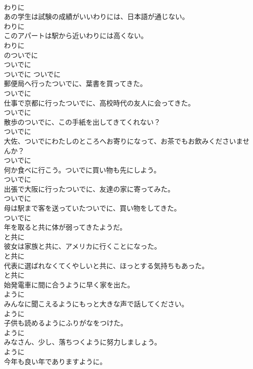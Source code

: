 \documentclass[8pt]{extreport}
\begin{document}
\begin{CJK}{UTF8}{min}
\\	わりに
\\	あの学生は試験の成績がいいわりには、日本語が通じない。	
\\	わりに
\\	このアパートは駅から近いわりには高くない。	
\\	わりに
\\	のついでに	
\\	ついでに	
\\	ついでに	ついでに
\\	郵便局へ行ったついでに、葉書を買ってきた。	
\\	ついでに
\\	仕事で京都に行ったついでに、高校時代の友人に会ってきた。	
\\	ついでに
\\	散歩のついでに、この手紙を出してきてくれない？	
\\	ついでに
\\	大佐、ついでにわたしのところへお寄りになって、お茶でもお飲みくださいませんか？	
\\	ついでに
\\	何か食べに行こう。ついでに買い物も先にしよう。	
\\	ついでに
\\	出張で大阪に行ったついでに、友達の家に寄ってみた。	
\\	ついでに
\\	母は駅まで客を送っていたついでに、買い物をしてきた。	
\\	ついでに
\\	年を取ると共に体が弱ってきたようだ。	
\\	と共に
\\	彼女は家族と共に、アメリカに行くことになった。	
\\	と共に
\\	代表に選ばれなくてくやしいと共に、ほっとする気持ちもあった。	
\\	と共に
\\	始発電車に間に合うように早く家を出た。	
\\	ように
\\	みんなに聞こえるようにもっと大きな声で話してください。	
\\	ように
\\	子供も読めるようにふりがなをつけた。	
\\	ように
\\	みなさん、少し、落ちつくように努力しましょう。	
\\	ように
\\	今年も良い年でありますように。	

\end{CJK}
\end{document}
